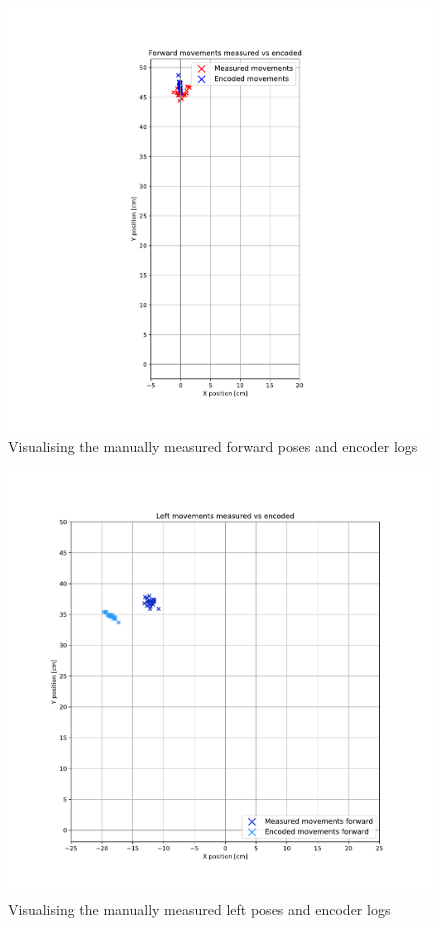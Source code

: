     \begin{figure}[!ht] 
            \centering 
            \includegraphics[page={1}, scale=.50]{images/pdf/forward_movements_measured_and_encoded.pdf}
            \caption{Visualising the manually measured forward poses and encoder logs}
            \label{fig:encoder-1}
    \end{figure}
    
      \begin{figure}[!ht] 
            \centering 
            \includegraphics[page={1}, scale=.50]{images/pdf/left_movements_measured_and_encoded.pdf}
            \caption{Visualising the manually measured left poses and encoder logs}
            \label{fig:encoder-2}
    \end{figure}
    
